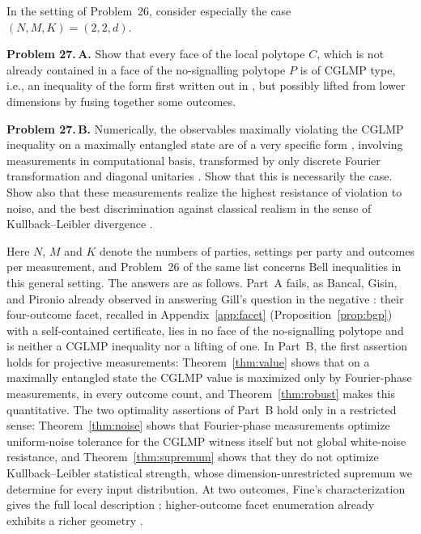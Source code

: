 \documentclass[11pt]{amsart}
\theoremstyle{remark}
\theoremstyle{plain}
\numberwithin{equation}{section}
\begin{document}
\begin{tcolorbox}[colback=white,colframe=black!60,boxrule=0.5pt,arc=1.5pt,
  left=6pt,right=6pt,top=4pt,bottom=4pt,
  title={Problem 27 (IQOQI Open Quantum Problems): The power of CGLMP inequalities},
  coltitle=white,colbacktitle=black!60]
\small
In the setting of Problem~26, consider especially the case \((N,M,K)=(2,2,d)\).

\smallskip\noindent\textbf{Problem 27.\,A.}
Show that every face of the local polytope \(C\), which is not already
contained in a face of the no-signalling polytope \(P\) is of CGLMP type,
i.e., an inequality of the form first written out in \cite{CGLMP}, but
possibly lifted from lower dimensions by fusing together some outcomes.

\smallskip\noindent\textbf{Problem 27.\,B.}
Numerically, the observables maximally violating the CGLMP inequality on
a maximally entangled state are of a very specific form \cite{DKZ},
involving measurements in computational basis, transformed by only
discrete Fourier transformation and diagonal unitaries \cite{CGLMP}. Show
that this is necessarily the case. Show also that these measurements
realize the highest resistance of violation to noise, and the best
discrimination against classical realism in the sense of
Kullback--Leibler divergence \cite{VDGG}.
\end{tcolorbox}

Here \(N\), \(M\) and \(K\) denote the numbers of parties, settings per
party and outcomes per measurement, and Problem~26 of the same list
concerns Bell inequalities in this general setting. The answers are as
follows. Part~A fails, as Bancal, Gisin, and Pironio already observed
in answering Gill's question in the negative \cite{BGP}: their four-outcome
facet, recalled in Appendix~\ref{app:facet} (Proposition~\ref{prop:bgp})
with a self-contained certificate, lies in no face of the no-signalling
polytope and is neither a CGLMP inequality nor a lifting of one. In
Part~B, the first assertion holds for projective measurements:
Theorem~\ref{thm:value} shows that on a maximally entangled state the
CGLMP value is maximized only by Fourier-phase measurements, in every
outcome count, and Theorem~\ref{thm:robust} makes this quantitative.
The two optimality assertions of Part~B hold only in a restricted sense:
Theorem~\ref{thm:noise} shows that Fourier-phase measurements optimize
uniform-noise tolerance for the CGLMP witness itself but not global
white-noise resistance, and Theorem~\ref{thm:supremum} shows that they
do not optimize Kullback--Leibler statistical strength, whose
dimension-unrestricted supremum we determine for every input
distribution. At two outcomes, Fine's characterization gives the full
local description \cite{Fine}; higher-outcome facet enumeration already
exhibits a richer geometry \cite{CG,BGP,JC,Staufenbiel}.
\end{document}
